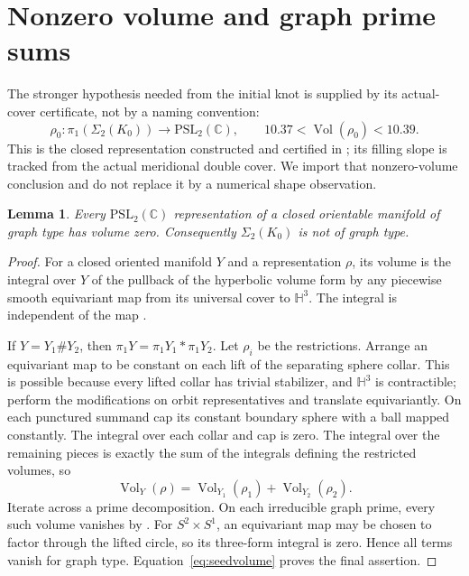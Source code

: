 \documentclass[11pt]{article}
\newtheorem{lemma}[theorem]{Lemma}
\newcommand{\Sig}{\Sigma_2}
\newcommand{\Vol}{\operatorname{Vol}}
\begin{document}
\section{Nonzero volume and graph prime sums}

The stronger hypothesis needed from the initial knot is supplied by
its actual-cover certificate, not by a naming convention:
\begin{equation}\label{eq:seedvolume}
 \rho_0:\pi_1(\Sig(K_0))\longrightarrow\mathrm{PSL}_2(\mathbb C),
 \qquad 10.37<\Vol(\rho_0)<10.39.
\end{equation}
This is the closed representation constructed and certified in
\cite[Theorem \texttt{thm:nongraph} and its proof]{seed}; its filling
slope is tracked from the actual meridional double cover. We import
that nonzero-volume conclusion and do not replace it by a numerical
shape observation.

\begin{lemma}\label{lem:sumvolume}
Every $\mathrm{PSL}_2(\mathbb C)$ representation of a closed orientable
manifold of graph type has volume zero. Consequently $\Sig(K_0)$ is
not of graph type.
\end{lemma}
\begin{proof}
For a closed oriented manifold $Y$ and a representation $\rho$, its
volume is the integral over $Y$ of the pullback of the hyperbolic
volume form by any piecewise smooth equivariant map from its
universal cover to $\mathbb H^3$. The integral is independent of the
map \cite[Section~4.6, p.~11]{lty}.

If $Y=Y_1\#Y_2$, then $\pi_1Y=\pi_1Y_1*\pi_1Y_2$.
Let $\rho_i$ be the restrictions. Arrange an equivariant map to be
constant on each lift of the separating sphere collar. This is
possible because every lifted collar has trivial stabilizer, and
$\mathbb H^3$ is contractible; perform the modifications on orbit
representatives and translate equivariantly. On each punctured
summand cap its constant boundary sphere with a ball mapped
constantly. The integral over each collar and cap is zero. The
integral over the remaining pieces is exactly the sum of the
integrals defining the restricted volumes, so
\[
                 \Vol_Y(\rho)=\Vol_{Y_1}(\rho_1)+\Vol_{Y_2}(\rho_2).
\]
Iterate across a prime decomposition. On each irreducible graph
prime, every such volume vanishes by
\cite[Lemma~4.10, p.~11]{lty}. For $S^2\times S^1$, an equivariant
map may be chosen to factor through the lifted circle, so its
three-form integral is zero. Hence all terms vanish for graph type.
Equation~\eqref{eq:seedvolume} proves the final assertion.
\end{proof}
\end{document}
